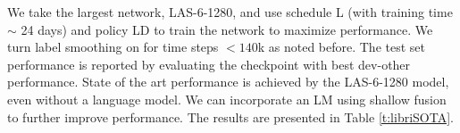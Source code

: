 \begin{table}[h!]
  \caption{LibriSpeech test WER (\%) evaluated for varying networks, schedules and policies. First row from \cite{irie-arxiv-2019}.}
  \footnotesize
  \label{t:LibriSpeech}
  \centering
\end{table}

We take the largest network, LAS-6-1280, and use schedule L (with training time $\sim$ 24 days) and policy LD to train the network to maximize performance. We turn label smoothing on for time steps $< 140$k as noted before. The test set performance is reported by evaluating the checkpoint with best dev-other performance. State of the art performance is achieved by the LAS-6-1280 model, even without a language model. We can incorporate an LM using shallow fusion to further improve performance. The results are presented in Table \ref{t:libriSOTA}.

